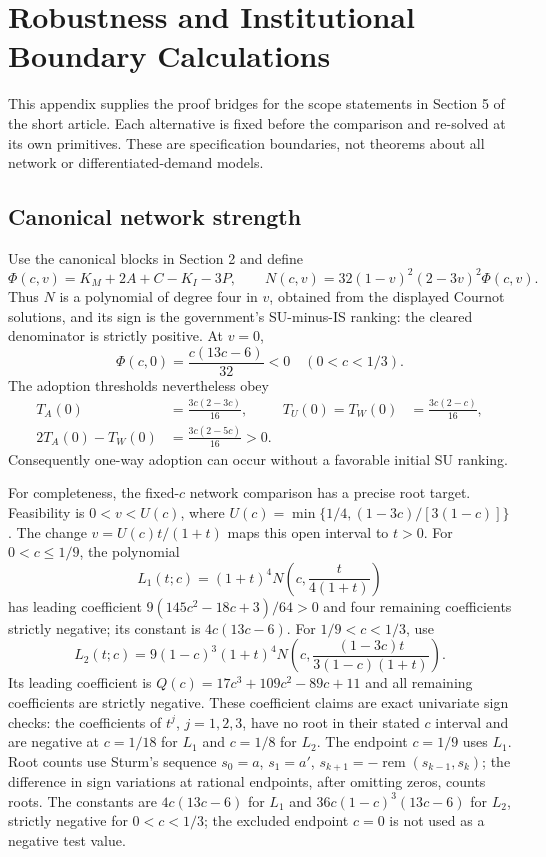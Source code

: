 \section{Robustness and Institutional Boundary Calculations}
\label{app:robustness}
This appendix supplies the proof bridges for the scope statements in Section 5
of the short article. Each alternative is fixed before the comparison and
re-solved at its own primitives. These are specification boundaries, not
theorems about all network or differentiated-demand models.

\subsection{Canonical network strength}
Use the canonical blocks in Section 2 and define
\[
\Phi(c,v)=K_M+2A+C-K_I-3P,
\qquad N(c,v)=32(1-v)^2(2-3v)^2\Phi(c,v).
\]
Thus $N$ is a polynomial of degree four in $v$, obtained from the displayed
Cournot solutions, and its sign is the government's SU-minus-IS ranking:
the cleared denominator is strictly positive. At $v=0$,
\[
\Phi(c,0)=\frac{c(13c-6)}{32}<0\quad(0<c<1/3).
\]
The adoption thresholds nevertheless obey
\begin{align*}
T_A(0)&=\frac{3c(2-3c)}{16},&
T_U(0)=T_W(0)&=\frac{3c(2-c)}{16},\\
2T_A(0)-T_W(0)&=\frac{3c(2-5c)}{16}>0.
\end{align*}
Consequently one-way adoption can occur without a favorable initial SU ranking.

For completeness, the fixed-$c$ network comparison has a precise root target.
Feasibility is $0<v<U(c)$, where
$U(c)=\min\{1/4,(1-3c)/[3(1-c)]\}$. The change
$v=U(c)t/(1+t)$ maps this open interval to $t>0$.
For $0<c\le1/9$, the polynomial
\[
L_1(t;c)=(1+t)^4N\left(c,\frac{t}{4(1+t)}\right)
\]
has leading coefficient $9(145c^2-18c+3)/64>0$ and four remaining
coefficients strictly negative; its constant is $4c(13c-6)$.
For $1/9<c<1/3$, use
\[
L_2(t;c)=9(1-c)^3(1+t)^4
N\left(c,\frac{(1-3c)t}{3(1-c)(1+t)}\right).
\]
Its leading coefficient is $Q(c)=17c^3+109c^2-89c+11$ and all
remaining coefficients are strictly negative. These coefficient claims are
exact univariate sign checks: the coefficients of $t^j$, $j=1,2,3$, have no
root in their stated $c$ interval and are negative at $c=1/18$ for $L_1$
and $c=1/8$ for $L_2$. The endpoint $c=1/9$ uses $L_1$.
Root counts use Sturm's sequence $s_0=a$, $s_1=a'$,
$s_{k+1}=-\operatorname{rem}(s_{k-1},s_k)$; the difference in sign
variations at rational endpoints, after omitting zeros, counts roots.
The constants are $4c(13c-6)$ for $L_1$ and
$36c(1-c)^3(13c-6)$ for $L_2$, strictly negative for $0<c<1/3$;
the excluded endpoint $c=0$ is not used as a negative test value.

